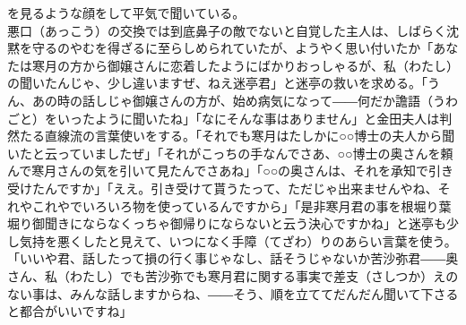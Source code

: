 \documentclass{book}
\begin{document}
を見るような顔をして平気で聞いている。\\
悪口（あっこう）の交換では到底鼻子の敵でないと自覚した主人は、しばらく沈黙を守るのやむを得ざるに至らしめられていたが、ようやく思い付いたか「あなたは寒月の方から御嬢さんに恋着したようにばかりおっしゃるが、私（わたし）の聞いたんじゃ、少し違いますぜ、ねえ迷亭君」と迷亭の救いを求める。「うん、あの時の話しじゃ御嬢さんの方が、始め病気になって――何だか譫語（うわごと）をいったように聞いたね」「なにそんな事はありません」と金田夫人は判然たる直線流の言葉使いをする。「それでも寒月はたしかに○○博士の夫人から聞いたと云っていましたぜ」「それがこっちの手なんでさあ、○○博士の奥さんを頼んで寒月さんの気を引いて見たんでさあね」「○○の奥さんは、それを承知で引き受けたんですか」「ええ。引き受けて貰うたって、ただじゃ出来ませんやね、それやこれやでいろいろ物を使っているんですから」「是非寒月君の事を根堀り葉堀り御聞きにならなくっちゃ御帰りにならないと云う決心ですかね」と迷亭も少し気持を悪くしたと見えて、いつになく手障（てざわ）りのあらい言葉を使う。「いいや君、話したって損の行く事じゃなし、話そうじゃないか苦沙弥君――奥さん、私（わたし）でも苦沙弥でも寒月君に関する事実で差支（さしつか）えのない事は、みんな話しますからね、――そう、順を立ててだんだん聞いて下さると都合がいいですね」\\
\end{document}
